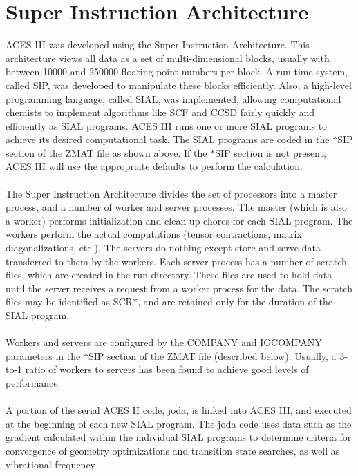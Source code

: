 \documentclass[12pt]{article}
\begin{document}
\section{\Large \bf Super Instruction Architecture} 

ACES III was developed using the Super Instruction Architecture. This architecture views 
all data as a set of multi-dimensional blocks, usually with between 10000 and 250000 
floating point numbers per block.  A run-time system, called SIP, was developed to manipulate 
these blocks efficiently.  Also, a high-level programming language, called SIAL, was 
implemented, allowing computational chemists to implement algorithms like SCF and CCSD 
fairly quickly and efficiently as SIAL programs. ACES III runs one or more SIAL programs to 
achieve its desired computational task.  The SIAL programs are coded in the $*$SIP section 
of the ZMAT file as shown above. If the $*$SIP section is not present, ACES III will use 
the appropriate defaults to perform the calculation.\\ 
\\ 
The Super Instruction Architecture divides the set of processors into a master process, and 
a number of worker and server processes.  The master (which is also a worker) performs 
initialization and clean up chores for each SIAL program. The workers perform the actual 
computations (tensor contractions, matrix diagonalizations, etc.).  The servers do nothing 
except store and serve data transferred to them by the workers.  Each server process has a number of 
scratch files, which are created in the run directory.  These files are used to hold data 
until the server receives a request from a worker process for the data.  The scratch files 
may be identified as SCR$*$, and are retained only for the duration of the SIAL program.\\ 
\\ 
Workers and servers are configured by the COMPANY and IOCOMPANY parameters in the $*$SIP 
section of the ZMAT file (described below). Usually, a 3-to-1 ratio of workers to servers 
has been found to achieve good levels of performance.\\
\\ 
A portion of the serial ACES II code, joda, is linked into ACES III, and executed at the 
beginning of each new SIAL program.  The joda code uses data such as the gradient 
calculated within the individual SIAL programs to determine criteria for convergence of 
geometry optimizations and transition state searches, as well as vibrational frequency 
\end{document}
